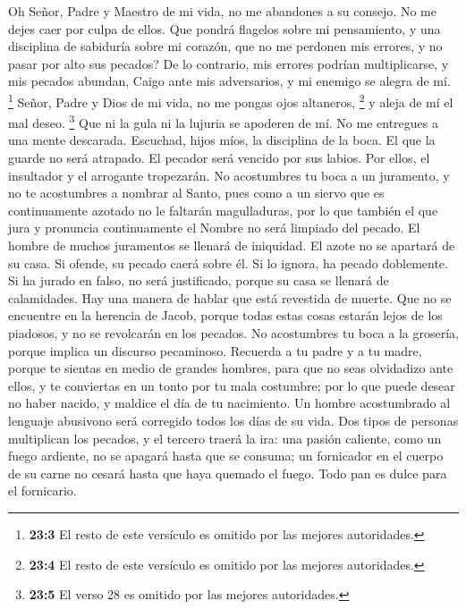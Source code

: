  Oh Señor, Padre y Maestro de mi vida, no me abandones a
su consejo. No me dejes caer por culpa de ellos.  Que
pondrá flagelos sobre mi pensamiento, y una disciplina de sabiduría
sobre mi corazón, que no me perdonen mis errores, y no pasar por alto
sus pecados?  De lo contrario, mis errores podrían
multiplicarse, y mis pecados abundan, Caigo ante mis adversarios, y mi
enemigo se alegra de mí. \footnote{\textbf{23:3} El resto de este
  versículo es omitido por las mejores autoridades.} 
Señor, Padre y Dios de mi vida, no me pongas ojos altaneros, \footnote{\textbf{23:4}
  El resto de este versículo es omitido por las mejores autoridades.}
 y aleja de mí el mal deseo. \footnote{\textbf{23:5} El
  verso 28 es omitido por las mejores autoridades.}  Que
ni la gula ni la lujuria se apoderen de mí. No me entregues a una mente
descarada.  Escuchad, hijos míos, la disciplina de la
boca. El que la guarde no será atrapado.  El pecador será
vencido por sus labios. Por ellos, el insultador y el arrogante
tropezarán.  No acostumbres tu boca a un juramento, y no
te acostumbres a nombrar al Santo,  pues como a un siervo
que es continuamente azotado no le faltarán magulladuras, por lo que
también el que jura y pronuncia continuamente el Nombre no será limpiado
del pecado.  El hombre de muchos juramentos se llenará de
iniquidad. El azote no se apartará de su casa. Si ofende, su pecado
caerá sobre él. Si lo ignora, ha pecado doblemente. Si ha jurado en
falso, no será justificado, porque su casa se llenará de calamidades.
 Hay una manera de hablar que está revestida de muerte.
Que no se encuentre en la herencia de Jacob, porque todas estas cosas
estarán lejos de los piadosos, y no se revolcarán en los pecados.
 No acostumbres tu boca a la grosería, porque implica un
discurso pecaminoso.  Recuerda a tu padre y a tu madre,
porque te sientas en medio de grandes hombres, para que no seas
olvidadizo ante ellos, y te conviertas en un tonto por tu mala
costumbre; por lo que puede desear no haber nacido, y maldice el día de
tu nacimiento.  Un hombre acostumbrado al lenguaje
abusivono será corregido todos los días de su vida.  Dos
tipos de personas multiplican los pecados, y el tercero traerá la ira:
una pasión caliente, como un fuego ardiente, no se apagará hasta que se
consuma; un fornicador en el cuerpo de su carne no cesará hasta que haya
quemado el fuego.  Todo pan es dulce para el fornicario.
